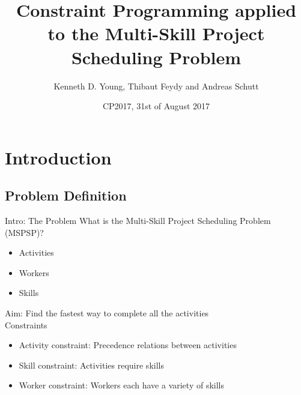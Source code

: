 \documentclass{beamer}
\title[CP applied to the MSPSP]{Constraint Programming applied to the Multi-Skill Project Scheduling Problem}
\author{Kenneth D. Young, Thibaut Feydy and Andreas Schutt}
\date{CP2017, 31st of August 2017}
\begin{document}
\maketitle

\section{Introduction}
\subsection{Problem Definition}
\begin{frame}{Intro: The Problem}
	What is the Multi-Skill Project Scheduling Problem (MSPSP)?\pause
	\begin{itemize}
		\item Activities
		\item Workers
		\item Skills\pause
	\end{itemize}
	\vspace{4mm}
	\alert{Aim:} Find the fastest way to complete all the activities\pause\\
	\vspace{4mm}
	Constraints
	\begin{itemize}
		\item Activity constraint: Precedence relations between activities
		\item Skill constraint: Activities require skills
		\item Worker constraint: Workers each have a variety of skills
	\end{itemize}
\end{frame}
\end{document}
